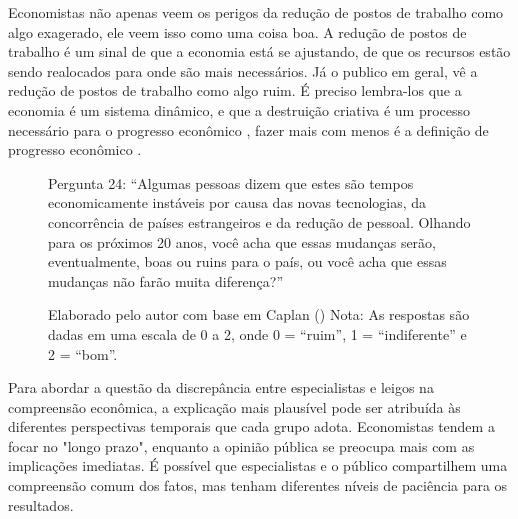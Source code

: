 Economistas não apenas veem os perigos da redução de postos de trabalho como algo exagerado, ele veem isso como uma coisa boa. A redução de postos de trabalho é um sinal de que a economia está se ajustando, de que os recursos estão sendo realocados para onde são mais necessários. Já o publico em geral, vê a redução de postos de trabalho como algo ruim. É preciso lembra-los que a economia é um sistema dinâmico, e que a destruição criativa é um processo necessário para o progresso econômico \cite{schumpeter1976capitalism}, fazer mais com menos é a definição de progresso econômico \cite{The_Myth_of_the_Rational_Voter}.



\begin{figure}[H]
    \centering
    \caption*{Pergunta 24: “Algumas pessoas dizem que estes são tempos economicamente instáveis por causa das novas tecnologias, da concorrência de países estrangeiros e da redução de pessoal. Olhando para os próximos 20 anos, você acha que essas mudanças serão, eventualmente, boas ou ruins para o país, ou você acha que essas mudanças não farão muita diferença?”}
    \caption{Elaborado pelo autor com base em Caplan (\citeyear{The_Myth_of_the_Rational_Voter}) \newline
    Nota: As respostas são dadas em uma escala de 0 a 2, onde 0 = “ruim”, 1 = “indiferente” e 2 = “bom”.}
    \label{fig:pergunta_24}
\end{figure}

Para abordar a questão da discrepância entre especialistas e leigos na compreensão econômica, a explicação mais plausível pode ser atribuída às diferentes perspectivas temporais que cada grupo adota. Economistas tendem a focar no "longo prazo", enquanto a opinião pública se preocupa mais com as implicações imediatas. É possível que especialistas e o público compartilhem uma compreensão comum dos fatos, mas tenham diferentes níveis de paciência para os resultados.

